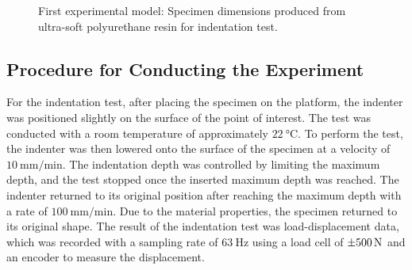\begin{figure}%
    \centering
   \qquad
   \caption[Specimen dimensions]{First experimental model: Specimen dimensions produced from ultra-soft polyurethane resin for indentation test.}%
   \label{fig:specimenhole}%
\end{figure}

\subsection*{Procedure for Conducting the Experiment}
For the indentation test, after placing the specimen on the platform,
the indenter was positioned slightly on the surface of the point of interest. 
The test was conducted with a room temperature of approximately $\SI{22}{\degreeCelsius}$.
To perform the test, the indenter was then lowered onto the surface of the specimen
at a velocity of $\SI[per-mode = symbol]{10}{\milli \m\per \minute}$.
The indentation depth was controlled by limiting the maximum depth, and the 
test stopped once the inserted maximum depth was reached. The indenter returned to its 
original position after reaching the maximum depth with a rate of 
$\SI[per-mode = symbol]{100}{\milli \m\per \minute}$. Due to the material properties,
the specimen returned to its original shape.
The result of the indentation test was load-displacement data,
which was recorded with a sampling rate of $\SI{63}{\hertz}$ using a load 
cell of $\SI{\pm 500}{\newton}$ and an encoder to measure the displacement.

